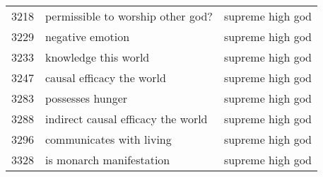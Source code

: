 \begin{tabular}{rll}
3218 & permissible to worship other god? & supreme high god \\
3229 & negative emotion & supreme high god \\
3233 & knowledge this world & supreme high god \\
3247 & causal efficacy the world & supreme high god \\
3283 & possesses hunger & supreme high god \\
3288 & indirect causal efficacy the world & supreme high god \\
3296 & communicates with living & supreme high god \\
3328 & is monarch manifestation & supreme high god \\
\bottomrule
\end{tabular}

